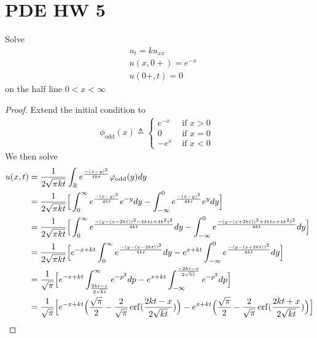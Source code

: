 \documentclass{report}
\begin{document}
\section{PDE HW 5}
\begin{question}{}{}
Solve 
\begin{align*}
&u_t=ku_{xx}\\
&u(x,0+)=e^{-x}\\
&u(0+,t)=0
\end{align*}
on the half line $0<x<\infty$
\end{question}
\begin{proof}
Extend the initial condition to 
\begin{align*}
\phi_{\operatorname{odd}}(x)\triangleq \begin{cases}
  e^{-x}& \text{ if $x>0$ }\\
  0& \text{ if $x=0$ }\\
  -e^{x}& \text{ if $x<0$ }
\end{cases}
\end{align*}
We then solve 
\begin{align*}
u(x,t)&=\frac{1}{2\sqrt{\pi kt} }\int_{\mathbb{R}} e^{\frac{-(x-y)^2}{4kt}}\varphi_{\operatorname{odd}}(y)dy\\
&=\frac{1}{2 \sqrt{\pi kt} }\Big[\int_0^\infty e^{\frac{-(x-y)^2}{4kt}}e^{-y}dy - \int_{-\infty}^0 e^{\frac{-(x-y)^2}{4kt}}e^ydy  \Big] \\
&=\frac{1}{2 \sqrt{\pi kt} }\Big[\int_0^{\infty}e^{\frac{-(y-(x-2kt))^2-4ktx+4k^2t^2}{4kt}}dy -\int^{0}_{-\infty}e^{\frac{-(y-(x+2kt))^2+4ktx+4k^2t^2}{4kt}}dy  \Big] \\
&=\frac{1}{2 \sqrt{\pi kt} }\Big[e^{-x+kt}\int_0^{\infty}e^{\frac{-(y-(x-2kt))^2}{4kt}}dy -e^{x+kt}\int^{0}_{-\infty}e^{\frac{-(y-(x+2kt))^2}{4kt}}dy  \Big]  \\
&=\frac{1}{\sqrt{\pi} }\Big[e^{-x+kt}\int_{\frac{2kt-x}{2\sqrt{kt} }}^{\infty}e^{-p^2}dp -e^{x+kt}\int_{-\infty}^{\frac{-2kt-x}{2\sqrt{kt} }}e^{-p^2}dp \Big]\\
&=\frac{1}{\sqrt{\pi} }\Big[e^{-x+kt}\Big( \frac{\sqrt{\pi} }{2}- \frac{2}{\sqrt{\pi}}\operatorname{erf}(\frac{2kt-x}{2\sqrt{kt} })   \Big)-e^{x+kt}\Big( \frac{\sqrt{\pi} }{2}- \frac{2}{\sqrt{\pi} }\operatorname{erf}( \frac{2kt+x}{2\sqrt{kt}}) \Big) \Big]
\end{align*}
\end{proof}
\end{document}
